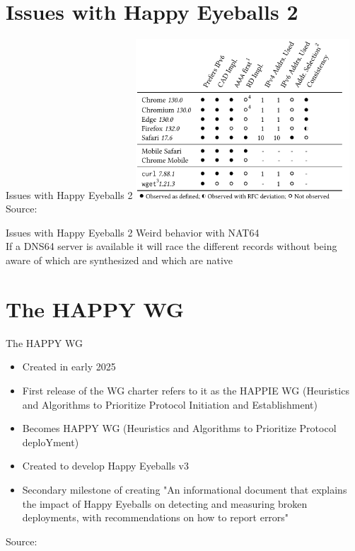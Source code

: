 \documentclass[aspectratio=169]{beamer}
\begin{document}
\section{Issues with Happy Eyeballs 2}
\begin{frame}{Issues with Happy Eyeballs 2}
  \centering
  \includegraphics[width=0.6\textwidth]{impl3.png}
  \\
  {\tiny Source: }
\end{frame}


\begin{frame}{Issues with Happy Eyeballs 2}
  \centering
  Weird behavior with NAT64 \\
  If a DNS64 server is available it will race the different records without being aware of which are synthesized and which are native
\end{frame}

\section{The HAPPY WG}
\begin{frame}{The HAPPY WG}
  \begin{itemize}
    \item Created in early 2025
    \item First release of the WG charter refers to it as the HAPPIE WG (Heuristics and Algorithms to Prioritize Protocol Initiation and Establishment)
    \item Becomes HAPPY WG (Heuristics and Algorithms to Prioritize Protocol deploYment)
    \item Created to develop Happy Eyeballs v3
    \item Secondary milestone of creating "An informational document that explains the impact of Happy Eyeballs on detecting and measuring broken deployments, with recommendations on how to report errors"
  \end{itemize}
  \centering
  {\tiny Source: }
\end{frame}
\end{document}
